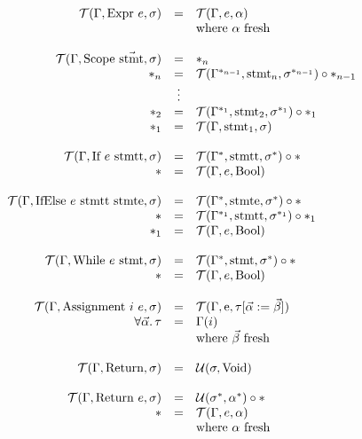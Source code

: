 \documentclass[14pt]{amsart}
\begin{document}
$\begin{array}{rcl}
	\T(\Gamma, \mbox{Expr}~e, \sigma) & = & \T(\Gamma, e, \alpha) \\
	& & \mbox{where}~\alpha~\mbox{fresh} \\

	\\

	\T(\Gamma, \mbox{Scope}~\vec{\mbox{stmt}}, \sigma) & = & \sn{n} \\
	\sn{n} & = & \T(\Gamma^{\sn{n-1}}, \mbox{stmt}_n, \sigma^{\sn{n-1}}) \circ \sn{n-1} \\
	& \vdots & \\
	\sn{2} & = & \T(\Gamma^{\sn{1}}, \mbox{stmt}_2, \sigma^{\sn{1}}) \circ \sn{1} \\
	\sn{1} & = & \T(\Gamma, \mbox{stmt}_1, \sigma) \\

	\\

	\T(\Gamma, \mbox{If}~e~\mbox{stmtt}, \sigma) & = & \T(\Gamma^{\s}, \mbox{stmtt}, \sigma^{\s}) \circ \s \\
	\s & = & \T(\Gamma, e, \mbox{Bool}) \\

	\\

	\T(\Gamma, \mbox{IfElse}~e~\mbox{stmtt}~\mbox{stmte}, \sigma) & = & \T(\Gamma^{\s}, \mbox{stmte}, \sigma^{\s}) \circ \s \\
	\s & = & \T(\Gamma^{\sn{1}}, \mbox{stmtt}, \sigma^{\sn{1}}) \circ \sn{1} \\
	\sn{1} & = & \T(\Gamma, e, \mbox{Bool}) \\

	\\

	\T(\Gamma, \mbox{While}~e~\mbox{stmt}, \sigma) & = & \T(\Gamma^{\s}, \mbox{stmt}, \sigma^{\s}) \circ \s \\
	\s & = & \T(\Gamma, e, \mbox{Bool}) \\

	\\

	\T(\Gamma, \mbox{Assignment}~i~e, \sigma) & = & \T(\Gamma, \mbox{e}, \tau [\vec{\alpha} := \vec{\beta}] ) \\
	\forall \vec{\alpha} .\, \tau & = & \Gamma(i) \\
	& & \mbox{where}~\vec{\beta}~\mbox{fresh} \\

	\\

	\T(\Gamma, \mbox{Return}, \sigma) & = & \U(\sigma, \mbox{Void}) \\

	\\

	\T(\Gamma, \mbox{Return}~e, \sigma) & = & \U(\sigma^{\s}, \alpha^{\s}) \circ \s \\
	\s & = & \T(\Gamma, e, \alpha) \\
	& & \mbox{where}~\alpha~\mbox{fresh} \\
\end{array}$
\end{document}
